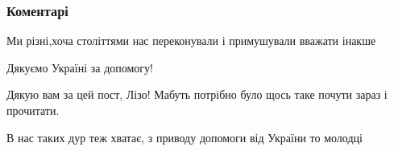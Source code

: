  
 
 
 
 
\subsubsection{Коментарі}

\begin{itemize}
 
Ми різні,хоча століттями нас переконували і примушували вважати інакше

 
Дякуємо Україні за допомогу!

 
Дякую вам за цей пост, Лізо! Мабуть потрібно було щось таке почути зараз і прочитати. 💛💙

 
В нас таких дур теж хватає, з приводу допомоги від України то молодці

 

\end{itemize}
